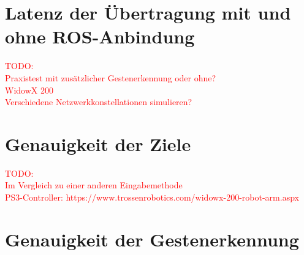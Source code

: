 \section{Latenz der Übertragung mit und ohne ROS-Anbindung}
\textcolor{red}{TODO:\\
Praxistest mit zusätzlicher Gestenerkennung oder ohne?\\
WidowX 200\\
Verschiedene Netzwerkkonstellationen simulieren? %
}




\section{Genauigkeit der Ziele}
\textcolor{red}{TODO:\\
Im Vergleich zu einer anderen Eingabemethode\\
PS3-Controller: https://www.trossenrobotics.com/widowx-200-robot-arm.aspx
}




\section{Genauigkeit der Gestenerkennung}

